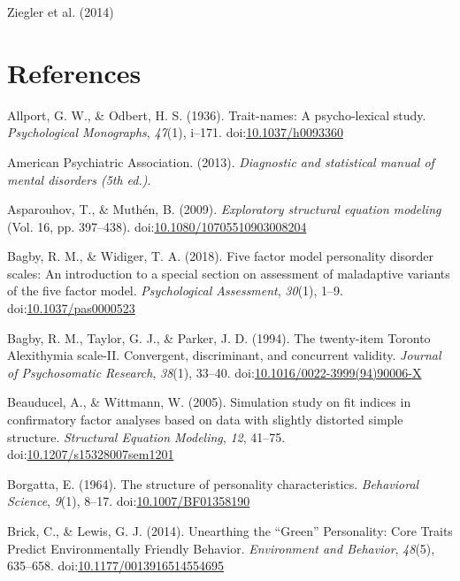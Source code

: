 \documentclass[,man,floatsintext]{apa6}
\begin{document}
Ziegler et al. (2014)

\newpage

\section{References}\label{references}

\begingroup
\setlength{\parindent}{-0.5in} \setlength{\leftskip}{0.5in}

\hypertarget{refs}{}
\hypertarget{ref-AllportOdbert1936}{}
Allport, G. W., \& Odbert, H. S. (1936). Trait-names: A psycho-lexical
study. \emph{Psychological Monographs}, \emph{47}(1), i--171.
doi:\href{https://doi.org/10.1037/h0093360}{10.1037/h0093360}

\hypertarget{ref-APA2013}{}
American Psychiatric Association. (2013). \emph{Diagnostic and
statistical manual of mental disorders (5th ed.)}.

\hypertarget{ref-AsparouhovMuthen2009}{}
Asparouhov, T., \& Muthén, B. (2009). \emph{Exploratory structural
equation modeling} (Vol. 16, pp. 397--438).
doi:\href{https://doi.org/10.1080/10705510903008204}{10.1080/10705510903008204}

\hypertarget{ref-Bagby2018}{}
Bagby, R. M., \& Widiger, T. A. (2018). Five factor model personality
disorder scales: An introduction to a special section on assessment of
maladaptive variants of the five factor model. \emph{Psychological
Assessment}, \emph{30}(1), 1--9.
doi:\href{https://doi.org/10.1037/pas0000523}{10.1037/pas0000523}

\hypertarget{ref-Bagby1994}{}
Bagby, R. M., Taylor, G. J., \& Parker, J. D. (1994). The twenty-item
Toronto Alexithymia scale-II. Convergent, discriminant, and concurrent
validity. \emph{Journal of Psychosomatic Research}, \emph{38}(1),
33--40.
doi:\href{https://doi.org/10.1016/0022-3999(94)90006-X}{10.1016/0022-3999(94)90006-X}

\hypertarget{ref-Beauducel2005}{}
Beauducel, A., \& Wittmann, W. (2005). Simulation study on fit indices
in confirmatory factor analyses based on data with slightly distorted
simple structure. \emph{Structural Equation Modeling}, \emph{12},
41--75.
doi:\href{https://doi.org/10.1207/s15328007sem1201}{10.1207/s15328007sem1201}

\hypertarget{ref-Borgatta1964}{}
Borgatta, E. (1964). The structure of personality characteristics.
\emph{Behavioral Science}, \emph{9}(1), 8--17.
doi:\href{https://doi.org/10.1007/BF01358190}{10.1007/BF01358190}

\hypertarget{ref-Brick2014}{}
Brick, C., \& Lewis, G. J. (2014). Unearthing the ``Green'' Personality:
Core Traits Predict Environmentally Friendly Behavior. \emph{Environment
and Behavior}, \emph{48}(5), 635--658.
doi:\href{https://doi.org/10.1177/0013916514554695}{10.1177/0013916514554695}
\end{document}
